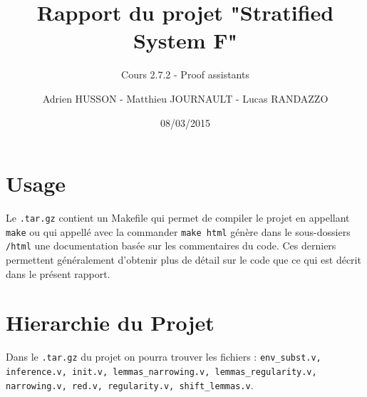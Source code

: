 \documentclass[a4paper,10pt]{scrartcl}
\title{Rapport du projet "Stratified System F"}
\subtitle{Cours 2.7.2 - Proof assistants}
\author{Adrien HUSSON - Matthieu JOURNAULT - Lucas RANDAZZO}
\date{08/03/2015}
\begin{document}
     \maketitle
     \section{Usage}
     Le \texttt{.tar.gz} contient un Makefile qui permet de compiler le projet en appellant \texttt{make} ou qui appellé avec la commander \texttt{make html} génère dans le sous-dossiers \texttt{/html} une documentation basée sur les commentaires du code. Ces derniers permettent généralement d'obtenir plus de détail sur le code que ce qui est décrit dans le présent rapport.
     \section{Hierarchie du Projet}
     Dans le \texttt{.tar.gz} du projet on pourra trouver les fichiers : \texttt{env\_subst.v, inference.v, init.v, lemmas\_narrowing.v, lemmas\_regularity.v, narrowing.v, red.v, regularity.v, shift\_lemmas.v}. 
\end{document}
